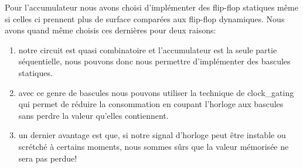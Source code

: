 \documentclass[12pt]{article}
\begin{document}
Pour l'accumulateur nous avons choisi d'implémenter des flip-flop statiques même si celles ci prennent plus de surface comparées aux flip-flop dynamiques. Nous avons quand même choisis ces dernières pour deux raisons:
\begin{enumerate}
\item notre circuit est quasi combinatoire et l'accumulateur est la seule partie séquentielle, nous pouvons donc nous permettre d'implémenter des bascules statiques.
\item avec ce genre de bascules nous pouvons utiliser la technique de clock\_gating qui permet de réduire la consommation en coupant l'horloge aux bascules  sans perdre la valeur qu'elles contiennent.
\item un dernier avantage est que, si notre signal d'horloge peut être instable ou scrétché à certains moments, nous sommes sûrs que la valeur mémorisée ne sera pas perdue! 
\end{enumerate}
\end{document}
